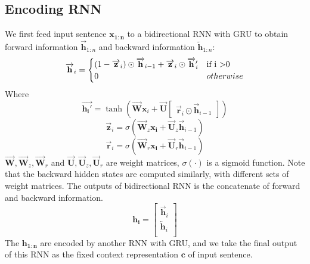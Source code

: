 \subsection{Encoding RNN}
We first feed input sentence $\mathbf{x_{1:n}}$ to a bidirectional RNN\cite{schuster1997bidirectional} with GRU\cite{chung2014empirical} to obtain forward information $\overrightarrow{\mathbf{h}}_{1:n}$ and backward information $\overleftarrow{\mathbf{h}}_{1:n}$:
\begin{equation}
\overrightarrow{\mathbf{h}}_{i} =\begin{cases}
(1-\overrightarrow{\mathbf{z}}_{i})\odot\overrightarrow{\mathbf{h}}_{i-1} + \overrightarrow{\mathbf{z}}_{i}\odot\overrightarrow{\mathbf{h}}'_{i} & \text{if i \textgreater 0}\\
0 & otherwise \\
\end{cases}
\end{equation}
Where
\begin{equation}
\overrightarrow{\mathbf{h_{i}}'} = \tanh(\overrightarrow{\mathbf{W}}\mathbf{x}_{i}+\overrightarrow{\mathbf{U}}\begin{bmatrix}
	\overrightarrow{\mathbf{r}}_{i}\odot\overrightarrow{\mathbf{h}}_{i-1}
	\end{bmatrix})
\end{equation}
\begin{equation}
\overrightarrow{\mathbf{z}}_{i} = \sigma(\overrightarrow{\mathbf{W}}_{z}\mathbf{x_{i}}+\overrightarrow{\mathbf{U}}_{z}\overrightarrow{\mathbf{h}}_{i-1})
\end{equation}
\begin{equation}
\overrightarrow{\mathbf{r}}_{i}= \sigma(\overrightarrow{\mathbf{W}}_{r}\mathbf{x_{i}}+\overrightarrow{\mathbf{U}}_{r}\overrightarrow{\mathbf{h}}_{i-1})
\end{equation}
$\overrightarrow{\mathbf{W}},\overrightarrow{\mathbf{W}}_{z},\overrightarrow{\mathbf{W}}_{r}$ and  $\overrightarrow{\mathbf{U}},\overrightarrow{\mathbf{U}}_{z},\overrightarrow{\mathbf{U}}_{r}$ are weight matrices, $\sigma(\cdot)$ is a sigmoid function. 
Note that the backward hidden states are computed similarly, with different sets of weight matrices. 
The outputs of bidirectional RNN is the concatenate of forward and backward information.
\begin{equation}
\mathbf{h_{i}} = \begin{bmatrix}
\overrightarrow{\mathbf{h}}_{i} \\
\overleftarrow{\mathbf{h}}_{i}\\
\end{bmatrix}
\end{equation}
The $\mathbf{h_{1:n}}$ are encoded by another RNN with GRU, and we take the final output of this RNN as the fixed context representation $\mathbf{c}$ of input sentence.
